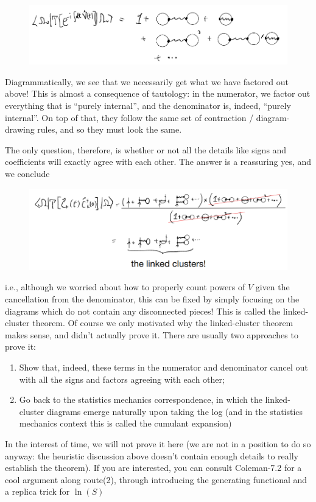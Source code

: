 \begin{figure}[H]
    \centering
    \includegraphics[width=\textwidth]{jupyterbook/data/fig/lec17-fig13.png}
\end{figure}

Diagrammatically, we see that we necessarily get what we have factored out above! This is almost a consequence of tautology: in the numerator, we factor out everything that is ``purely internal'', and the denominator is, indeed, ``purely internal''. On top of that, they follow the same set of contraction / diagram-drawing rules, and so they must look the same.

The only question, therefore, is whether or not all the details like signs and coefficients will exactly agree with each other. The answer is a reassuring yes, and we conclude

\begin{figure}[H]
    \centering
    \includegraphics[width=\textwidth]{jupyterbook/data/fig/lec17-fig14.png}
\end{figure}

i.e., although we worried about how to properly count powers of $V$ given the cancellation from the denominator, this can be fixed by simply focusing on the diagrams which do not contain any disconnected pieces! This is called the linked-cluster theorem. Of course we only motivated why the linked-cluster theorem makes sense, and didn't actually prove it. There are usually two approaches to prove it:
\begin{enumerate}
    \item Show that, indeed, these terms in the numerator and denominator cancel out with all the signs and factors agreeing with each other;
    \item Go back to the statistics mechanics correspondence, in which the linked-cluster diagrams emerge naturally upon taking the log (and in the statistics mechanics context this is called the cumulant expansion)
\end{enumerate}

In the interest of time, we will not prove it here (we are not in a position to do so anyway: the heuristic discussion above doesn't contain enough details to really establish the theorem). If you are interested, you can consult Coleman-7.2 for a cool argument along route(2), through introducing the generating functional and a replica trick for $\ln(S)$
